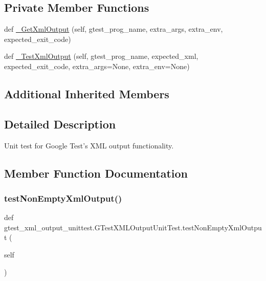 \subsection*{Private Member Functions}
\begin{DoxyCompactItemize}
\item 
def \mbox{\hyperlink{classgtest__xml__output__unittest_1_1_g_test_x_m_l_output_unit_test_ae57479fcca1861b35c9bcd26d08a18f4}{\+\_\+\+Get\+Xml\+Output}} (self, gtest\+\_\+prog\+\_\+name, extra\+\_\+args, extra\+\_\+env, expected\+\_\+exit\+\_\+code)
\item 
def \mbox{\hyperlink{classgtest__xml__output__unittest_1_1_g_test_x_m_l_output_unit_test_a1d8a5fdd7e602fe31b1477f8ebc1e7f3}{\+\_\+\+Test\+Xml\+Output}} (self, gtest\+\_\+prog\+\_\+name, expected\+\_\+xml, expected\+\_\+exit\+\_\+code, extra\+\_\+args=None, extra\+\_\+env=None)
\end{DoxyCompactItemize}
\subsection*{Additional Inherited Members}


\subsection{Detailed Description}
\begin{DoxyVerb}Unit test for Google Test's XML output functionality.
\end{DoxyVerb}
 

\subsection{Member Function Documentation}
\mbox{\label{classgtest__xml__output__unittest_1_1_g_test_x_m_l_output_unit_test_a310c136c1eb2b421f57651a7d358b17a}} 
\subsubsection{\texorpdfstring{test\+Non\+Empty\+Xml\+Output()}{testNonEmptyXmlOutput()}}
{\footnotesize\ttfamily def gtest\+\_\+xml\+\_\+output\+\_\+unittest.\+G\+Test\+X\+M\+L\+Output\+Unit\+Test.\+test\+Non\+Empty\+Xml\+Output (\begin{DoxyParamCaption}\item[{}]{self }\end{DoxyParamCaption})}

